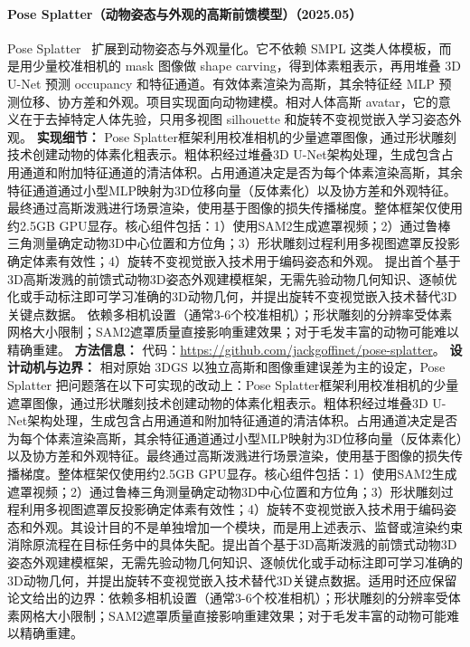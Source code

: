 \paragraph{Pose Splatter（动物姿态与外观的高斯前馈模型）（2025.05）}
Pose Splatter~\cite{2505_18342} 扩展到动物姿态与外观量化。它不依赖 SMPL 这类人体模板，而是用少量校准相机的 mask 图像做 shape carving，得到体素粗表示，再用堆叠 3D U-Net 预测 occupancy 和特征通道。有效体素渲染为高斯，其余特征经 MLP 预测位移、协方差和外观。项目实现面向动物建模。相对人体高斯 avatar，它的意义在于去掉特定人体先验，只用多视图 silhouette 和旋转不变视觉嵌入学习姿态外观。
\textbf{实现细节：} Pose Splatter框架利用校准相机的少量遮罩图像，通过形状雕刻技术创建动物的体素化粗表示。粗体积经过堆叠3D U-Net架构处理，生成包含占用通道和附加特征通道的清洁体积。占用通道决定是否为每个体素渲染高斯，其余特征通道通过小型MLP映射为3D位移向量（反体素化）以及协方差和外观特征。最终通过高斯泼溅进行场景渲染，使用基于图像的损失传播梯度。整体框架仅使用约2.5GB GPU显存。核心组件包括：1）使用SAM2生成遮罩视频；2）通过鲁棒三角测量确定动物3D中心位置和方位角；3）形状雕刻过程利用多视图遮罩反投影确定体素有效性；4）旋转不变视觉嵌入技术用于编码姿态和外观。 提出首个基于3D高斯泼溅的前馈式动物3D姿态外观建模框架，无需先验动物几何知识、逐帧优化或手动标注即可学习准确的3D动物几何，并提出旋转不变视觉嵌入技术替代3D关键点数据。 依赖多相机设置（通常3-6个校准相机）；形状雕刻的分辨率受体素网格大小限制；SAM2遮罩质量直接影响重建效果；对于毛发丰富的动物可能难以精确重建。
\textbf{方法信息：} 代码：\url{https://github.com/jackgoffinet/pose-splatter}。
\textbf{设计动机与边界：} 相对原始 3DGS 以独立高斯和图像重建误差为主的设定，Pose Splatter 把问题落在以下可实现的改动上：Pose Splatter框架利用校准相机的少量遮罩图像，通过形状雕刻技术创建动物的体素化粗表示。粗体积经过堆叠3D U-Net架构处理，生成包含占用通道和附加特征通道的清洁体积。占用通道决定是否为每个体素渲染高斯，其余特征通道通过小型MLP映射为3D位移向量（反体素化）以及协方差和外观特征。最终通过高斯泼溅进行场景渲染，使用基于图像的损失传播梯度。整体框架仅使用约2.5GB GPU显存。核心组件包括：1）使用SAM2生成遮罩视频；2）通过鲁棒三角测量确定动物3D中心位置和方位角；3）形状雕刻过程利用多视图遮罩反投影确定体素有效性；4）旋转不变视觉嵌入技术用于编码姿态和外观。其设计目的不是单独增加一个模块，而是用上述表示、监督或渲染约束消除原流程在目标任务中的具体失配。提出首个基于3D高斯泼溅的前馈式动物3D姿态外观建模框架，无需先验动物几何知识、逐帧优化或手动标注即可学习准确的3D动物几何，并提出旋转不变视觉嵌入技术替代3D关键点数据。适用时还应保留论文给出的边界：依赖多相机设置（通常3-6个校准相机）；形状雕刻的分辨率受体素网格大小限制；SAM2遮罩质量直接影响重建效果；对于毛发丰富的动物可能难以精确重建。
